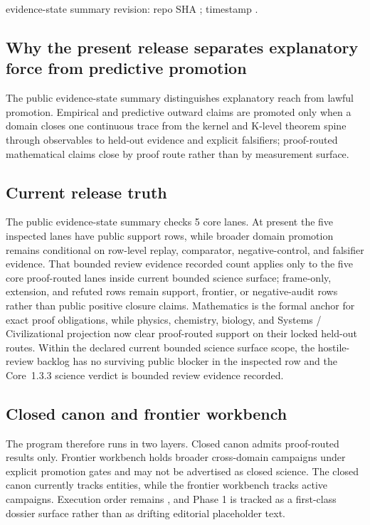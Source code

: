 evidence-state summary revision: repo SHA ; timestamp .

\subsection{Why the present release separates explanatory force from predictive promotion}
The public evidence-state summary distinguishes explanatory reach from lawful promotion. Empirical and predictive outward claims are promoted only when a domain closes one continuous trace from the kernel and K-level theorem spine through observables to held-out evidence and explicit falsifiers; proof-routed mathematical claims close by proof route rather than by measurement surface.

\subsection{Current release truth}
The public evidence-state summary checks 5 core lanes. At present the five inspected lanes have public support rows, while broader domain promotion remains conditional on row-level replay, comparator, negative-control, and falsifier evidence.
That bounded review evidence recorded count applies only to the five core proof-routed lanes inside current bounded science surface; frame-only, extension, and refuted rows remain support, frontier, or negative-audit rows rather than public positive closure claims.
Mathematics is the formal anchor for exact proof obligations, while physics, chemistry, biology, and Systems / Civilizational projection now clear proof-routed support on their locked held-out routes. Within the declared current bounded science surface scope, the hostile-review backlog has no surviving public blocker in the inspected row and the Core~1.3.3 science verdict is bounded review evidence recorded.

\subsection{Closed canon and frontier workbench}
The program therefore runs in two layers. Closed canon admits proof-routed results only. Frontier workbench holds broader cross-domain campaigns under explicit promotion gates and may not be advertised as closed science.
The closed canon currently tracks  entities, while the frontier workbench tracks  active campaigns.
Execution order remains , and Phase 1 is tracked as a first-class dossier surface rather than as drifting editorial placeholder text.

